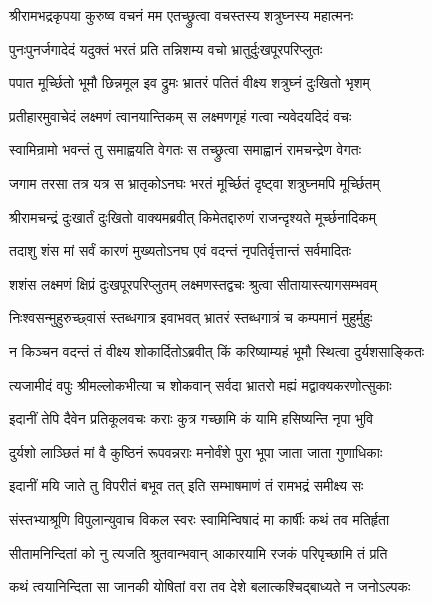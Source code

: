 \twolineshloka
{श्रीरामभद्रकृपया कुरुष्व वचनं मम}
{एतच्छ्रुत्वा वचस्तस्य शत्रुघ्नस्य महात्मनः}%

\twolineshloka
{पुनःपुनर्जगादेदं यदुक्तं भरतं प्रति}
{तन्निशम्य वचो भ्रातुर्दुःखपूरपरिप्लुतः}%

\twolineshloka
{पपात मूर्च्छितो भूमौ छिन्नमूल इव द्रुमः}
{भ्रातरं पतितं वीक्ष्य शत्रुघ्नं दुःखितो भृशम्}%

\twolineshloka
{प्रतीहारमुवाचेदं लक्ष्मणं त्वानयान्तिकम्}
{स लक्ष्मणगृहं गत्वा न्यवेदयदिदं वचः}%


\twolineshloka
{स्वामिन्रामो भवन्तं तु समाह्वयति वेगतः}
{स तच्छ्रुत्वा समाह्वानं रामचन्द्रेण वेगतः}%

\twolineshloka
{जगाम तरसा तत्र यत्र स भ्रातृकोऽनघः}
{भरतं मूर्च्छितं दृष्ट्वा शत्रुघ्नमपि मूर्च्छितम्}%

\twolineshloka
{श्रीरामचन्द्रं दुःखार्तं दुःखितो वाक्यमब्रवीत्}
{किमेतद्दारुणं राजन्दृश्यते मूर्च्छनादिकम्}%

\twolineshloka
{तदाशु शंस मां सर्वं कारणं मुख्यतोऽनघ}
{एवं वदन्तं नृपतिर्वृत्तान्तं सर्वमादितः}%

\twolineshloka
{शशंस लक्ष्मणं क्षिप्रं दुःखपूरपरिप्लुतम्}
{लक्ष्मणस्तद्वचः श्रुत्वा सीतायास्त्यागसम्भवम्}%

\twolineshloka
{निःश्वसन्मुहुरुच्छ्वासं स्तब्धगात्र इवाभवत्}
{भ्रातरं स्तब्धगात्रं च कम्पमानं मुहुर्मुहुः}%

\twolineshloka
{न किञ्चन वदन्तं तं वीक्ष्य शोकार्दितोऽब्रवीत्}
{किं करिष्याम्यहं भूमौ स्थित्वा दुर्यशसाङ्कितः}%

\twolineshloka
{त्यजामीदं वपुः श्रीमल्लोकभीत्या च शोकवान्}
{सर्वदा भ्रातरो मह्यं मद्वाक्यकरणोत्सुकाः}%

\twolineshloka
{इदानीं तेपि दैवेन प्रतिकूलवचः कराः}
{कुत्र गच्छामि कं यामि हसिष्यन्ति नृपा भुवि}%

\twolineshloka
{दुर्यशो लाञ्छितं मां वै कुष्ठिनं रूपवन्नराः}
{मनोर्वंशे पुरा भूपा जाता जाता गुणाधिकाः}%

\twolineshloka
{इदानीं मयि जाते तु विपरीतं बभूव तत्}
{इति सम्भाषमाणं तं रामभद्रं समीक्ष्य सः}%

\twolineshloka
{संस्तभ्याश्रूणि विपुलान्युवाच विकल स्वरः}
{स्वामिन्विषादं मा कार्षीः कथं तव मतिर्हृता}%

\twolineshloka
{सीतामनिन्दितां को नु त्यजति श्रुतवान्भवान्}
{आकारयामि रजकं परिपृच्छामि तं प्रति}%

\twolineshloka
{कथं त्वयानिन्दिता सा जानकी योषितां वरा}
{तव देशे बलात्कश्चिद्बाध्यते न जनोऽल्पकः}%

